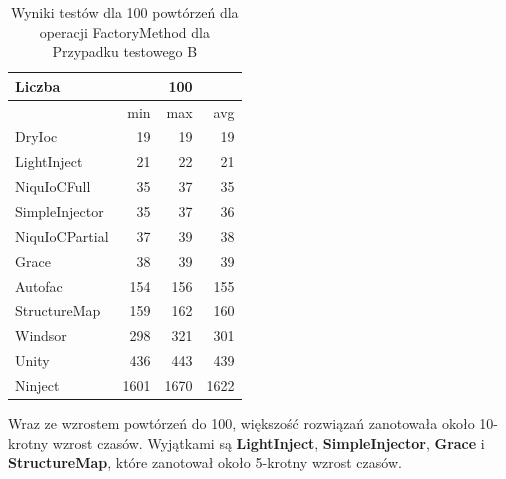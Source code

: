 \documentclass[12pt]{article}
\begin{document}
\begin{table}[H]
\captionsetup{belowskip=0pt,aboveskip=0pt}
\begin{center}
\begin{small}
	\begin{tabular}{ | l | r r r | }
    		\hline
Liczba & & 100 & \\ \hline
 & min & max & avg \\ \hline
DryIoc & 19 & 19 & 19 \\ \hline
LightInject & 21 & 22 & 21 \\ \hline
NiquIoCFull & 35 & 37 & 35 \\ \hline
SimpleInjector & 35 & 37 & 36 \\ \hline
NiquIoCPartial & 37 & 39 & 38 \\ \hline
Grace & 38 & 39 & 39 \\ \hline
Autofac & 154 & 156 & 155 \\ \hline
StructureMap & 159 & 162 & 160 \\ \hline
Windsor & 298 & 321 & 301 \\ \hline
Unity & 436 & 443 & 439 \\ \hline
Ninject & 1601 & 1670 & 1622 \\ \hline
  	\end{tabular}
\end{small}
\end{center}
\caption{Wyniki testów dla 100 powtórzeń dla operacji FactoryMethod dla Przypadku testowego B}
\label{TestCaseB_FactoryMethod100}
\end{table}
Wraz ze wzrostem powtórzeń do 100, większość rozwiązań zanotowała około 10-krotny wzrost czasów. Wyjątkami są \textbf{LightInject}, \textbf{SimpleInjector}, \textbf{Grace} i \textbf{StructureMap}, które zanotował około 5-krotny wzrost czasów.
\\ \\
\end{document}
